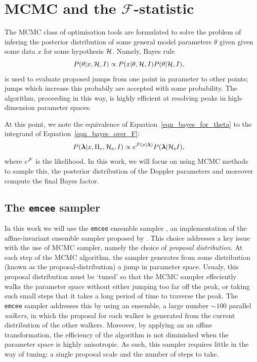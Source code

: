 \documentclass[aps, prd, twocolumn, superscriptaddress, floatfix, showpacs, nofootinbib, longbibliography]{revtex4-1}
\begin{document}
\section{MCMC and the $\mathcal{F}$-statistic}
\label{sec_MCMC_and_the_F_statistic}

The MCMC class of optimisation tools are formulated to solve the problem of
infering the posterior distribution of some general model parameters $\theta$
given given some data $x$ for some hypothesis $\mathcal{H}$. Namely, Bayes rule
\begin{equation}
P(\theta| x, \mathcal{H}, I) \propto P(x| \theta, \mathcal{H}, I)P(\theta| \mathcal{H}, I),
\label{eqn_bayes_for_theta}
\end{equation}
is used to evaluate proposed jumps from one point in parameter to other points;
jumps which increase this probabily are accepted with some probability. The
algorithm, proceeding in this way, is highly efficient at resolving peaks in
high-dimension parameter spaces.

At this point, we note the equivalence of Equation~\eqref{eqn_bayes_for_theta}
to the integrand of Equation~\eqref{eqn_bayes_over_F}:
\begin{equation}
P(\boldsymbol{\mathbf{\lambda}} | x, \Pi_{\rm c}, \mathcal{H}_{\rm s}, I)
\propto e^{{\mathcal{F}}(x| \boldsymbol{\mathbf{\lambda}})} P(\boldsymbol{\mathbf{\lambda}}| \mathcal{H}_{\rm s} I),
\label{eqn_lambda_posterior}
\end{equation}
where $e^{{\mathcal{F}}}$ is the likelihood.
In this work, we will focus on using MCMC methods to sample this, the
posterior distribution of the Doppler parameters and moreover compute the
final Bayes factor.

\subsection{The \texttt{emcee} sampler}

In this work we will use the \texttt{emcee} ensemble sampler
\citep{foreman-mackay2013}, an implementation of the affine-invariant ensemble
sampler proposed by \citet{goodman2010}. This choice addresses a key issue with
the use of MCMC sampler, namely the choice of \emph{proposal distribution}. At
each step of the MCMC algorithm, the sampler generates from some distribution
(known as the proposal-distribution) a jump in parameter space. Usualy, this
proposal distribution must be `tuned' so that the MCMC sampler effeciently
walks the parameter space without either jumping too far off the peak, or
taking such small steps that it takes a long period of time to traverse the
peak. The \texttt{emcee} sampler addresses this by using an ensemble, a large
number ${\sim}100$ parallel \emph{walkers}, in which the proposal for each
walker is generated from the current distribution of the other walkers.
Moreover, by applying an an affine transformation, the efficiency of the
algorithm is not diminished when the parameter space is highly anisotropic. As
such, this sampler requires little in the way of tuning: a single proposal
scale and the number of steps to take.
\end{document}
